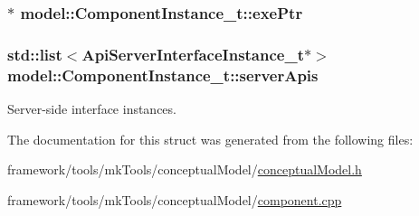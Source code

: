 \subsubsection[{\texorpdfstring{exe\+Ptr}{exePtr}}]{$\ast$ model\+::\+Component\+Instance\+\_\+t\+::exe\+Ptr}\hypertarget{structmodel_1_1_component_instance__t_a58482ce4be750f72cd09016a29b9d988}{}\label{structmodel_1_1_component_instance__t_a58482ce4be750f72cd09016a29b9d988}
\subsubsection[{\texorpdfstring{server\+Apis}{serverApis}}]{\setlength{\rightskip}{0pt plus 5cm}std\+::list$<${\bf Api\+Server\+Interface\+Instance\+\_\+t}$\ast$$>$ model\+::\+Component\+Instance\+\_\+t\+::server\+Apis}\hypertarget{structmodel_1_1_component_instance__t_a647c3093ee11fa933ac2ef2c7a11bfce}{}\label{structmodel_1_1_component_instance__t_a647c3093ee11fa933ac2ef2c7a11bfce}


Server-\/side interface instances. 



The documentation for this struct was generated from the following files\+:\begin{DoxyCompactItemize}
\item 
framework/tools/mk\+Tools/conceptual\+Model/\hyperlink{conceptual_model_8h}{conceptual\+Model.\+h}\item 
framework/tools/mk\+Tools/conceptual\+Model/\hyperlink{component_8cpp}{component.\+cpp}\end{DoxyCompactItemize}
